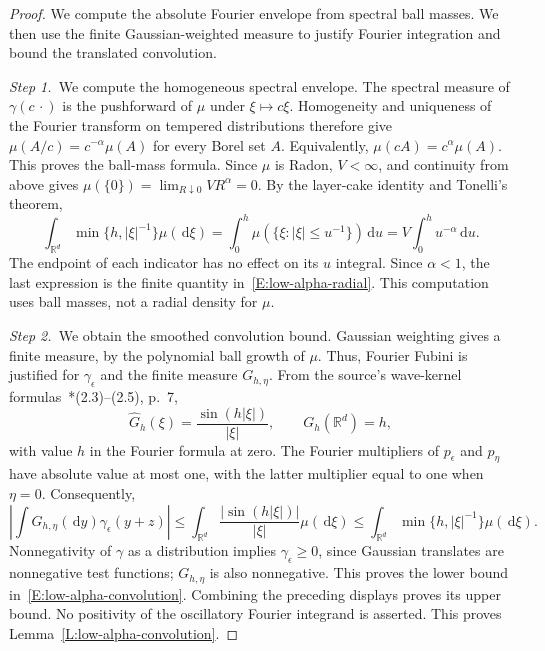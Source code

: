 \documentclass[12pt,oneside,openany]{book}
\numberwithin{equation}{section}
\theoremstyle{nogostyle}
\theoremstyle{definition}
\newcommand{\R}{\mathbb{R}}
\newcommand{\ud}{\,\mathrm{d}}
\begin{document}
\begin{proof}
  We compute the absolute Fourier envelope from spectral ball masses. We then
  use the finite Gaussian-weighted measure to justify Fourier integration and
  bound the translated convolution.


  \medskip
  \noindent\textit{Step 1.~}We compute the homogeneous spectral envelope.
  The spectral measure of $\gamma(c\,\cdot)$ is the pushforward of $\mu$ under
  $\xi\mapsto c\xi$. Homogeneity and uniqueness of the Fourier transform on
  tempered distributions therefore give $\mu(A/c) = c^{-\alpha}\mu(A)$ for every
  Borel set $A$. Equivalently, $\mu(cA) = c^\alpha\mu(A)$. This proves the
  ball-mass formula. Since $\mu$ is Radon, $V < \infty$, and continuity from
  above gives $\mu(\{0\}) = \lim_{R\downarrow0}VR^\alpha = 0$. By the layer-cake
  identity and Tonelli's theorem,
  \[
    \int_{\R^d}\min\{h,|\xi|^{-1}\}\mu(\ud\xi)
    =\int_0^h\mu(\{\xi:|\xi|\le u^{-1}\})\ud u
    =V\int_0^h u^{-\alpha}\ud u.
  \]
  The endpoint of each indicator has no effect on its $u$ integral. Since
  $\alpha < 1$, the last expression is the finite quantity
  in~\eqref{E:low-alpha-radial}. This computation uses ball masses, not a radial
  density for $\mu$.


  \medskip
  \noindent\textit{Step 2.~}We obtain the smoothed convolution bound.
  Gaussian weighting gives a finite measure, by the polynomial ball growth of
  $\mu$. Thus, Fourier Fubini is justified for $\gamma_\epsilon$ and the finite
  measure $G_{h,\eta}$. From the source's wave-kernel
  formulas~\cite{chen:author2026:time-dependency}*{(2.3)--(2.5), p.~7},
  \[
    \widehat{G}_h(\xi)=\frac{\sin(h|\xi|)}{|\xi|},\qquad
    G_h(\R^d)=h,
  \]
  with value $h$ in the Fourier formula at zero. The Fourier multipliers of
  $p_\epsilon$ and $p_\eta$ have absolute value at most one, with the latter
  multiplier equal to one when $\eta = 0$. Consequently,
  \[
    \left|\int G_{h,\eta}(\ud y)\gamma_\epsilon(y+z)\right|
    \le\int_{\R^d}\frac{|\sin(h|\xi|)|}{|\xi|}\mu(\ud\xi)
    \le\int_{\R^d}\min\{h,|\xi|^{-1}\}\mu(\ud\xi).
  \]
  Nonnegativity of $\gamma$ as a distribution implies $\gamma_\epsilon \ge 0$,
  since Gaussian translates are nonnegative test functions; $G_{h,\eta}$ is also
  nonnegative. This proves the lower bound in~\eqref{E:low-alpha-convolution}.
  Combining the preceding displays proves its upper bound. No positivity of the
  oscillatory Fourier integrand is asserted. This proves
  Lemma~\ref{L:low-alpha-convolution}.
\end{proof}
\end{document}
